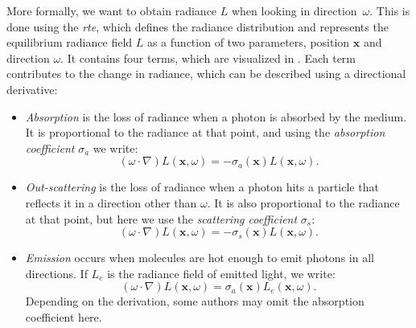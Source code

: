 More formally, we want to obtain radiance $L$ when looking in
direction~$\omega$. This is done using the \emph{\ac{rte}}, which defines the
radiance distribution and represents the equilibrium radiance field $L$ as a
function of two parameters, position $\mathbf{x}$ and direction $\omega$. It
contains four terms, which are visualized in . Each term
contributes to the change in radiance, which can be described using a
directional derivative:
\begin{itemize}
    \item \emph{Absorption} is the loss of radiance when a photon is absorbed by
    the medium. It is proportional to the radiance at that point, and using the
    \emph{absorption coefficient} $\sigma_a$ we write:
    \begin{equation}
        (\omega \cdot \nabla) L(\mathbf{x}, \omega) =
            -\sigma_a(\mathbf{x}) L(\mathbf{x}, \omega).
    \end{equation}

    \item \emph{Out-scattering} is the loss of radiance when a photon hits a
    particle that reflects it in a direction other than $\omega$. It is also
    proportional to the radiance at that point, but here we use the
    \emph{scattering coefficient} $\sigma_s$:
    \begin{equation}
        (\omega \cdot \nabla) L(\mathbf{x}, \omega) =
            -\sigma_s(\mathbf{x}) L(\mathbf{x}, \omega).
    \end{equation}

    \item \emph{Emission} occurs when molecules are hot enough to emit photons
    in all directions. If $L_e$ is the radiance field of emitted light, we
    write:
    \begin{equation}
        (\omega \cdot \nabla) L(\mathbf{x}, \omega) =
            \sigma_a(\mathbf{x}) L_e(\mathbf{x}, \omega). 
    \end{equation}
    Depending on the derivation, some authors may omit the absorption
    coefficient here.


\end{itemize}
